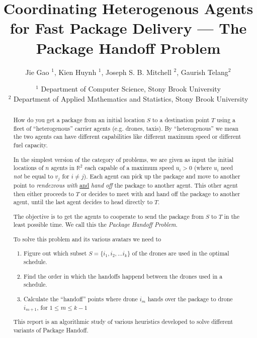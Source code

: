 \documentclass[10pt, english, oneside]{report}
\title{\huge{\bfseries{Coordinating Heterogenous Agents for Fast Package Delivery --- The Package Handoff Problem}}}
\author{Jie Gao $^1$, 
       Kien Huynh $^1$, 
       Joseph S. B. Mitchell $^2$, 
       Gaurish Telang$^2$}
\date{
\small{$^1$ Department of Computer Science, Stony Brook University \\%
$^2$ Department of Applied Mathematics and Statistics, Stony Brook University} \\[2ex]%
}
\begin{document}
\maketitle

\begin{abstract}
How do you get a package from an initial location $S$ to a destination point $T$ using a 
fleet of ``heterogenous'' carrier agents (e.g. drones, taxis). By ``heterogenous'' we mean 
the two agents can have different capabilities like different maximum speed
or different fuel capacity. 

\vspace{2mm}

In the simplest version of the category of problems, 
we are given as input the initial locations of $n$  agents in $\mathbb{R}^2$ 
each capable of a maximum speed $u_i >0$ (where $u_i$ need \textsl{not} be equal to $v_j$ for $i \neq j$). 
Each agent can pick up the package and move to another point to \textit{rendezvous with} \underline{and} 
\textit{hand off} the 
package to another agent. This other agent then either proceeds to $T$ or decides to meet with 
and hand off the package to another agent, until the last agent decides to head directly to $T$. 

\vspace{2mm}

The objective is to get the agents to cooperate to send the package from $S$ to $T$ in the 
least possible time. We call this the \textit{Package Handoff Problem}. 

\vspace{2mm}

To solve this problem and its various avatars we need to 

\vspace{2mm}

\begin{enumerate}
\item Figure out which subset $S = \{i_1, i_2, \ldots i_k\}$ of the drones are used in the optimal schedule. 
\item Find the order in which the handoffs happend between the drones used in a schedule. 
\item Calculate the ``handoff'' points where drone $i_m$ hands over the package to drone 
      $i_{m+1}$, for $1 \leq m \leq k-1$
\end{enumerate}

\vspace{2mm}

This report is an algorithmic study of various heuristics developed to solve different variants of Package Handoff.

\end{abstract}
\end{document}
